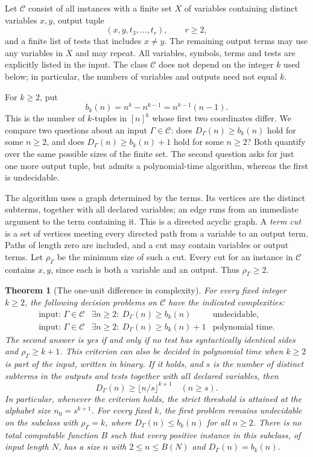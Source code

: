 \documentclass[12pt]{article}
\newtheorem{theorem}{Theorem}[section]
\theoremstyle{definition}
\begin{document}
Let $\mathcal C$ consist of all instances with a finite set $X$ of
variables containing distinct variables $x,y$, output tuple
\[
 (x,y,t_3,\ldots,t_r),\qquad r\ge2,
\]
and a finite list of tests that includes $x\ne y$. The remaining output
terms may use any variables in $X$ and may repeat. All variables, symbols,
terms and tests are explicitly listed in the input. The class
$\mathcal C$ does not depend on the integer $k$ used below; in particular,
the numbers of variables and outputs need not equal $k$.

For $k\ge2$, put
\[
 b_k(n)=n^k-n^{k-1}=n^{k-1}(n-1).
\]
This is the number of $k$-tuples in $[n]^k$ whose first two coordinates
differ. We compare two questions about an input $\Gamma\in\mathcal C$:
does $D_\Gamma(n)\ge b_k(n)$ hold for some $n\ge2$, and does
$D_\Gamma(n)\ge b_k(n)+1$ hold for some $n\ge2$? Both quantify over
the same possible sizes of the finite set. The second question asks for
just one more output tuple, but admits a polynomial-time algorithm,
whereas the first is undecidable.

The algorithm uses a graph determined by the terms. Its vertices are
the distinct subterms, together with all declared variables; an edge
runs from an immediate argument to the term containing it. This is a
directed acyclic graph. A \emph{term cut} is a set of vertices meeting
every directed path from a variable to an output term. Paths of length
zero are included, and a cut may contain variables or output terms.
Let $\rho_\Gamma$ be the minimum size of such a cut. Every cut for an
instance in $\mathcal C$ contains $x,y$, since each is both a variable
and an output. Thus $\rho_\Gamma\ge2$.

\begin{theorem}[The one-unit difference in complexity]\label{thm:main}
For every fixed integer $k\ge2$, the following decision problems on
$\mathcal C$ have the indicated complexities:
\[
\begin{array}{lll}
 \text{input: }\Gamma\in\mathcal C&
 \exists n\ge2:\ D_\Gamma(n)\ge b_k(n)&\text{undecidable},\\[2pt]
 \text{input: }\Gamma\in\mathcal C&
 \exists n\ge2:\ D_\Gamma(n)\ge b_k(n)+1&\text{polynomial time}.
\end{array}
\]
The second answer is yes if and only if no test has syntactically
identical sides and $\rho_\Gamma\ge k+1$. This criterion can also be
decided in polynomial time when $k\ge2$ is part of the input, written
in binary. If it holds, and $s$ is the number of distinct subterms in
the outputs and tests together with all declared variables, then
\[
 D_\Gamma(n)\ge\lfloor n/s\rfloor^{k+1}\quad(n\ge s).
\]
In particular, whenever the criterion holds, the strict threshold is
attained at the alphabet size $n_0=s^{k+1}$.
For every fixed $k$, the first problem remains undecidable on the
subclass with $\rho_\Gamma=k$, where $D_\Gamma(n)\le b_k(n)$ for all
$n\ge2$. There is no total computable function $B$ such that every
positive instance in this subclass, of input length $N$, has a size
$n$ with $2\le n\le B(N)$ and $D_\Gamma(n)=b_k(n)$.
\end{theorem}
\end{document}
